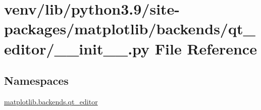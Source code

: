 \hypertarget{venv_2lib_2python3_89_2site-packages_2matplotlib_2backends_2qt__editor_2____init_____8py}{}\section{venv/lib/python3.9/site-\/packages/matplotlib/backends/qt\+\_\+editor/\+\_\+\+\_\+init\+\_\+\+\_\+.py File Reference}
\label{venv_2lib_2python3_89_2site-packages_2matplotlib_2backends_2qt__editor_2____init_____8py}
\subsection*{Namespaces}
\begin{DoxyCompactItemize}
\item 
 \hyperlink{namespacematplotlib_1_1backends_1_1qt__editor}{matplotlib.\+backends.\+qt\+\_\+editor}
\end{DoxyCompactItemize}
